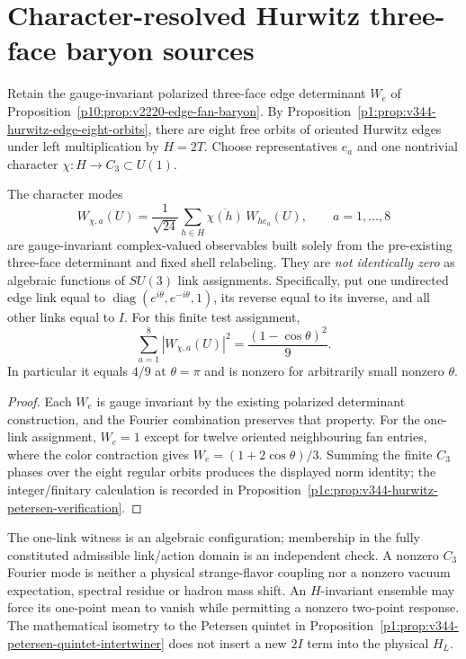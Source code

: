 \documentclass[12pt,a4paper]{article}
\begin{document}
\section{Character-resolved Hurwitz three-face baryon sources}
\label{p10:sec:v344-threeface-c3-mode}
Retain the gauge-invariant polarized three-face edge determinant
$W_e$ of Proposition~\ref{p10:prop:v2220-edge-fan-baryon}.
By Proposition~\ref{p1:prop:v344-hurwitz-edge-eight-orbits},
there are eight free orbits of oriented Hurwitz edges under left
multiplication by $H=2T$.  Choose representatives $e_a$ and
one nontrivial character $\chi:H\to C_3\subset U(1)$.

\begin{proposition}
\label{p10:prop:v344-threeface-character-witness}
The character modes
\[
 \boxed{W_{\chi,a}(U)=\frac1{\sqrt{24}}
   \sum_{h\in H}\overline{\chi(h)}\,W_{he_a}(U),
   \qquad a=1,\ldots,8}
\]
are gauge-invariant complex-valued observables built solely from
the pre-existing three-face determinant and fixed shell relabeling.
They are \emph{not identically zero} as algebraic functions of
$SU(3)$ link assignments.  Specifically, put one undirected edge
link equal to $\operatorname{diag}(e^{i\theta},e^{-i\theta},1)$,
its reverse equal to its inverse, and all other links equal to $I$.
For this finite test assignment,
\[
 \boxed{\sum_{a=1}^8|W_{\chi,a}(U)|^2
              =\frac{(1-\cos\theta)^2}{9}.}
\]
In particular it equals $4/9$ at $\theta=\pi$ and is nonzero
for arbitrarily small nonzero $\theta$.
\end{proposition}
\begin{proof}
Each $W_e$ is gauge invariant by the existing polarized determinant
construction, and the Fourier combination preserves that property.
For the one-link assignment, $W_e=1$ except for twelve oriented
neighbouring fan entries, where the color contraction gives
$W_e=(1+2\cos\theta)/3$.  Summing the finite $C_3$ phases over
the eight regular orbits produces the displayed norm identity;
the integer/finitary calculation is recorded in
Proposition~\ref{p1c:prop:v344-hurwitz-petersen-verification}.
\end{proof}

\begin{remark}
\label{p10:rem:v344-threeface-physical-boundary}
The one-link witness is an algebraic configuration; membership in
the fully constituted admissible link/action domain is an
independent check.  A nonzero $C_3$ Fourier mode is neither a
physical strange-flavor coupling nor a nonzero vacuum expectation,
spectral residue or hadron mass shift.  An $H$-invariant ensemble
may force its one-point mean to vanish while permitting a
nonzero two-point response.  The mathematical isometry to the
Petersen quintet in
Proposition~\ref{p1:prop:v344-petersen-quintet-intertwiner}
does not insert a new $2I$ term into the physical $H_L$.
\end{remark}
\end{document}
